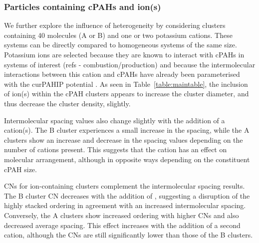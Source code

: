 \subsubsection{Particles containing cPAHs and ion(s)} 


We further explore the influence of heterogeneity by considering clusters containing 40 molecules (A or B) and one or two potassium cations.  These systems can be directly compared to homogeneous systems of the same size. Potassium ions are selected because they are known to interact with cPAHs in systems of interest (refs - combustion/production) and because the intermolecular interactions between this cation and cPAHs have already been parameterised with the curPAHIP potential \cite{bowal2019ion}. As seen in Table~\ref{table:maintable},
the inclusion of ion(s) within the cPAH clusters appears to increase the cluster diameter, and thus decrease the cluster density, slightly.

Intermolecular spacing values also change slightly with the addition of a cation(s). The B cluster experiences a small increase in the spacing, while the A clusters show an increase and decrease in the spacing values depending on the number of cations present. This suggests that the cation has an effect on molecular arrangement, although in opposite ways depending on the constituent cPAH size. %

CNs for ion-containing clusters complement the intermolecular spacing results. The B cluster CN decreases with the addition of , suggesting a disruption of the highly stacked ordering in agreement with an increased intermolecular spacing. Conversely, the A clusters show increased ordering with higher CNs and also decreased average spacing. This effect increases with the addition of a second cation, although the CNs are still significantly lower than those of the B clusters.

